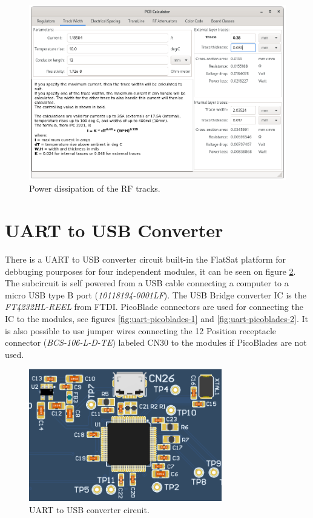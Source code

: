 \begin{figure}[!ht]
    \begin{center}
        \includegraphics[width=\textwidth]{figures/rf-track-width-power.png}
        \caption{Power dissipation of the RF tracks.}
        \label{fig:rf-track-width-power-calc}
    \end{center}
\end{figure}

\section{UART to USB Converter}

There is a UART to USB converter circuit built-in the FlatSat platform for debbuging pourposes for four independent modules, it can be seen on figure \ref{fig:ft4232h-circuit}. The subcircuit is self powered from a USB cable connecting a computer to a micro USB type B port (\textit{10118194-0001LF}). The    
USB Bridge converter IC is the \textit{FT4232HL-REEL} from FTDI. PicoBlade connectors are used for connecting the IC to the modules, see figures \ref{fig:uart-picoblades-1} and \ref{fig:uart-picoblades-2}. It is also possible to use jumper wires connecting the 12 Position receptacle connector (\textit{BCS-106-L-D-TE}) labeled CN30 to the modules if PicoBlades are not used.

\begin{figure}[!ht]
    \begin{center}
        \includegraphics[width=0.75\textwidth]{figures/ft4232h_circuit.png}
        \caption{UART to USB converter circuit.}
        \label{fig:ft4232h-circuit}
    \end{center}
\end{figure}

